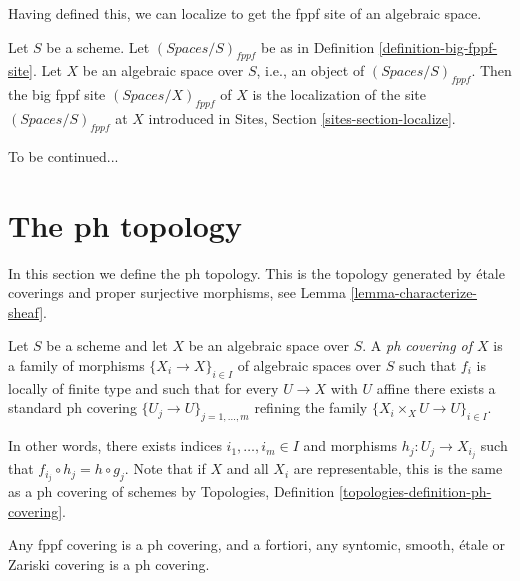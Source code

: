 \noindent
Having defined this, we can localize to get the fppf
site of an algebraic space.

\begin{definition}
\label{definition-big-small-fppf}
Let $S$ be a scheme. Let $(\textit{Spaces}/S)_{fppf}$ be as in
Definition \ref{definition-big-fppf-site}.
Let $X$ be an algebraic space over $S$, i.e., an object of
$(\textit{Spaces}/S)_{fppf}$. Then the big fppf site
{\it $(\textit{Spaces}/X)_{fppf}$} of $X$
is the localization of the site $(\textit{Spaces}/S)_{fppf}$
at $X$ introduced in Sites, Section \ref{sites-section-localize}.
\end{definition}

\noindent
To be continued...







\section{The ph topology}
\label{section-ph}

\noindent
In this section we define the ph topology. This is the topology
generated by \'etale coverings and proper surjective morphisms, see
Lemma \ref{lemma-characterize-sheaf}.

\begin{definition}
\label{definition-ph-covering}
Let $S$ be a scheme and let $X$ be an algebraic space over $S$.
A {\it ph covering of $X$} is a family
of morphisms $\{X_i \to X\}_{i \in I}$ of algebraic spaces over $S$
such that $f_i$ is locally of finite type and such that for every
$U \to X$ with $U$ affine there exists a standard ph covering
$\{U_j \to U\}_{j = 1, \ldots, m}$ refining the family
$\{X_i \times_X U \to U\}_{i \in I}$.
\end{definition}

\noindent
In other words, there exists indices $i_1, \ldots, i_m \in I$ and
morphisms $h_j : U_j \to X_{i_j}$ such that
$f_{i_j} \circ h_j = h \circ g_j$. Note that if $X$ and all $X_i$ are
representable, this is the same as a ph covering of schemes by
Topologies, Definition \ref{topologies-definition-ph-covering}.

\begin{lemma}
\label{lemma-zariski-etale-smooth-syntomic-fppf-ph}
Any fppf covering is a ph covering, and a fortiori,
any syntomic, smooth, \'etale or Zariski covering is a ph covering.
\end{lemma}

